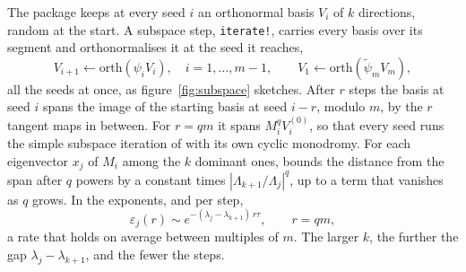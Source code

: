\documentclass[11pt,a4paper]{article}
\newcommand{\code}[1]{\texttt{#1}}
\begin{document}
The package keeps at every seed $i$ an orthonormal basis $V_i$ of $k$ directions, random at the
start. A subspace step, \code{iterate!}, carries every basis over its segment and orthonormalises
it at the seed it reaches,
\begin{equation}
  V_{i+1} \leftarrow \mathrm{orth}(\psi_i V_i), \quad i = 1, \dots, m-1, \qquad
  V_1 \leftarrow \mathrm{orth}(\tilde\psi_m V_m),
  \label{eq:step}
\end{equation}
all the seeds at once, as figure~\ref{fig:subspace} sketches. After $r$ steps the basis at seed $i$
spans the image of the starting basis at seed $i - r$, modulo $m$, by the $r$ tangent maps in
between. For $r = qm$ it spans $M_i^q V_i^{(0)}$, so that every seed runs the simple subspace
iteration of \citet[algorithm 5.1]{saad2011} with its own cyclic monodromy. For each eigenvector
$x_j$ of $M_i$ among the $k$ dominant ones, \citet[theorem 5.2]{saad2011} bounds the distance from
the span after $q$ powers by a constant times $|\Lambda_{k+1}/\Lambda_j|^q$, up to a term that
vanishes as $q$ grows. In the exponents, and per step,
\begin{equation}
  \varepsilon_j(r) \sim e^{-(\lambda_j - \lambda_{k+1})\, r\tau}, \qquad r = qm ,
  \label{eq:rate}
\end{equation}
a rate that holds on average between multiples of $m$. The larger $k$, the further the gap
$\lambda_j - \lambda_{k+1}$, and the fewer the steps.
\end{document}
